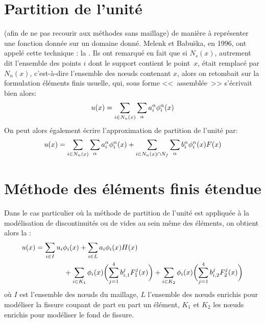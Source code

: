 \section{Partition de l'unité}\label{Sec-partition}
 (afin de ne pas recourir aux méthodes sans maillage) de manière à représenter une fonction donnée sur un domaine donné.
Melenk et
Babu\u{s}ka,
en 1996, ont appelé cette technique :
la .
Ils ont remarqué en fait que si $N_s(x)$, autrement dit l'ensemble des points $i$ dont le support contient le point~$x$, était remplacé par $N_n(x)$, c'est-à-dire l'ensemble des nœuds contenant $x$, alors on retombait sur la formulation éléments finis usuelle, qui, sous forme <<~assemblée~>> s'écrivait bien alors:
\begin{equation}
u(x) = \displaystyle\sum_{i\in N_n(x)}\displaystyle\sum_{\alpha} a_i^\alpha \phi_i^\alpha(x)
\end{equation}
 On peut alors également écrire l'approximation de partition de l'unité par:
\begin{equation}
u(x) = \displaystyle\sum_{i\in N_n(x)}\displaystyle\sum_{\alpha} a_i^\alpha \phi_i^\alpha(x) + \displaystyle\sum_{i\in N_n(x)\cap N_f}\displaystyle\sum_{\alpha} b_i^\alpha\phi_i^\alpha(x)F(x)
\end{equation}



\medskip
\section{Méthode des éléments finis étendue}\label{Sec-XFEM}
Dans le cas particulier où la méthode de partition de l'unité est appliquée à la modélisation de discontinuités ou de vides au sein même des éléments, on obtient alors la :
\begin{equation}
\begin{aligned}
u(x) &= \displaystyle\sum_{i\in I}u_i\phi_i(x) + \displaystyle\sum_{i\in L} a_i\phi_i(x) H(x)\\
&\qquad\qquad + \displaystyle\sum_{i\in K_1}\phi_i(x)\biggl(\displaystyle\sum_{j=1}^4b_{i,1}^jF_1^j(x)\biggr) + \displaystyle\sum_{i\in K_2}\phi_i(x)\biggl(\displaystyle\sum_{j=1}^4b_{i,2}^jF_2^j(x)\biggr)
\end{aligned}
\end{equation}
où $I$ est l'ensemble des nœuds du maillage, $L$ l'ensemble des nœuds enrichis pour modéliser la fissure coupant de part en part un élément, $K_1$ et $K_2$ les nœuds enrichis pour modéliser le fond de fissure.

